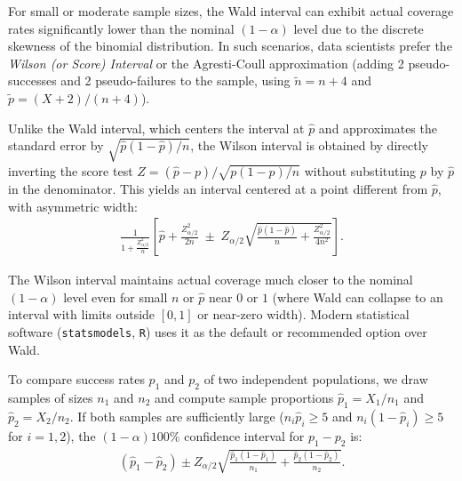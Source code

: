 \begin{observacion}
	For small or moderate sample sizes, the Wald interval can exhibit actual coverage rates significantly lower than the nominal $(1-\alpha)$ level due to the discrete skewness of the binomial distribution. In such scenarios, data scientists prefer the \emph{Wilson (or Score) Interval} or the Agresti-Coull approximation (adding 2 pseudo-successes and 2 pseudo-failures to the sample, using $\tilde{n} = n + 4$ and $\tilde{p} = (X+2)/(n+4)$).
\end{observacion}

\begin{teorema}
	Unlike the Wald interval, which centers the interval at $\hat{p}$ and approximates the standard error by $\sqrt{\hat p(1-\hat p)/n}$, the Wilson interval is obtained by directly inverting the score test $Z = (\hat{p}-p)/\sqrt{p(1-p)/n}$ without substituting $p$ by $\hat{p}$ in the denominator. This yields an interval centered at a point different from $\hat p$, with asymmetric width:
	\begin{align}
		\frac{1}{1+\frac{Z_{\alpha/2}^2}{n}}\left[\hat{p} + \frac{Z_{\alpha/2}^2}{2n} \;\pm\; Z_{\alpha/2}\sqrt{\frac{\hat{p}(1-\hat{p})}{n} + \frac{Z_{\alpha/2}^2}{4n^2}}\right].
	\end{align}
\end{teorema}

\begin{observacion}
	The Wilson interval maintains actual coverage much closer to the nominal $(1-\alpha)$ level even for small $n$ or $\hat p$ near $0$ or $1$ (where Wald can collapse to an interval with limits outside $[0,1]$ or near-zero width). Modern statistical software (\texttt{statsmodels}, \texttt{R}) uses it as the default or recommended option over Wald.
\end{observacion}

\begin{teorema}
	To compare success rates $p_1$ and $p_2$ of two independent populations, we draw samples of sizes $n_1$ and $n_2$ and compute sample proportions $\hat{p}_1 = X_1/n_1$ and $\hat{p}_2 = X_2/n_2$. If both samples are sufficiently large ($n_i\hat{p}_i \geq 5$ and $n_i(1-\hat{p}_i) \geq 5$ for $i=1,2$), the $(1-\alpha)100\%$ confidence interval for $p_1 - p_2$ is:
	\begin{align}
		(\hat{p}_1 - \hat{p}_2) \pm Z_{\alpha/2} \sqrt{\frac{\hat{p}_1(1-\hat{p}_1)}{n_1} + \frac{\hat{p}_2(1-\hat{p}_2)}{n_2}}.
	\end{align}
\end{teorema}

